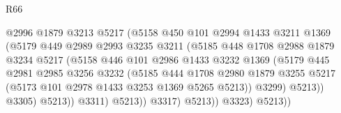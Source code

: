 \begin{lexlean}{R66}
\begin{coremodule}
                                    @2996
                                    @1879
                                    @3213
                                    @5217
                                    (@5158
                                      @450
                                      @101
                                      @2994
                                      @1433
                                      @3211
                                      @1369
                                      (@5179
                                        @449
                                        @2989
                                        @2993
                                        @3235
                                        @3211
                                        (@5185
                                          @448
                                          @1708
                                          @2988
                                          @1879
                                          @3234
                                          @5217
                                          (@5158
                                            @446
                                            @101
                                            @2986
                                            @1433
                                            @3232
                                            @1369
                                            (@5179
                                              @445
                                              @2981
                                              @2985
                                              @3256
                                              @3232
                                              (@5185
                                                @444
                                                @1708
                                                @2980
                                                @1879
                                                @3255
                                                @5217
                                                (@5173 @101 @2978 @1433 @3253 @1369 @5265 @5213))
                                              @3299)
                                            @5213))
                                        @3305)
                                      @5213))
                                  @3311)
                                @5213))
                            @3317)
                          @5213))
                      @3323)
                    @5213))

\end{coremodule}
\end{lexlean}
